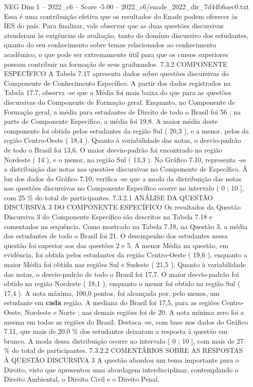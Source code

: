 \begin{textsample}{NEG Dim 1 – 2022\_c6 – Score -5.00 – 2022\_c6/enade\_2022\_dir\_7d44b6aec0.txt}
Essa é uma contribuição efetiva que os resultados do Enade podem oferecer às IES do país.
Para finalizar, vale observar que as duas questões discursivas atenderam às exigências de avaliação, tanto do domínio discursivo dos estudantes, quanto do seu conhecimento sobre temas relacionados ao conhecimento acadêmico, o que pode ser extremamente útil para que os cursos superiores possam contribuir na formação de seus graduandos. 7.3.2 COMPONENTE ESPECÍFICO A Tabela 7.17 apresenta dados sobre questões discursivas do Componente de Conhecimento Específico.
A partir dos dados registrados na Tabela 17.7, observa -se que a Média foi mais baixa do que para as questões discursivas do Componente de Formação geral.
Enquanto, no Componente de Formação geral, a média para estudantes de Direito de todo o Brasil foi 56 ; na parte de Componente Específico, a média foi 19,8.
A maior média deste componente foi obtida pelos estudantes da região Sul ( 20,3 ), e a menor, pelos da região Centro-Oeste ( 18,4 ).
Quanto à variabilidade das notas, o desvio-padrão de todo o Brasil foi 13,6.
O maior desvio-padrão foi encontrado na região Nordeste ( 14 ), e o menor, na região Sul ( 13,3 ).
No Gráfico 7.10, representa -se a distribuição das notas nas questões discursivas no Componente de Específico.
À luz dos dados do Gráfico 7.10, verifica -se que a moda da distribuição das notas nas questões discursivas no Componente Específico ocorre no intervalo ( 0 ; 10 ], com 25 \% do total de participantes. 7.3.2.1 ANÁLISE DA QUESTÃO DISCURSIVA 3 DO COMPONENTE ESPECÍFICO Os resultados da Questão Discursiva 3 do Componente Específico são descritos na Tabela 7.18 e comentados na sequência.
Como mostrado na Tabela 7.18, na Questão 3, a média dos estudantes de todo o Brasil foi 21.
O desempenho dos estudantes nessa questão foi superior aos das questões 2 e 5.
A menor Média na questão, em evidência, foi obtida pelos estudantes da região Centro-Oeste ( 19,6 ), enquanto a maior Média foi obtida nas regiões Sul e Sudeste ( 21,5 ).
Quanto à variabilidade das notas, o desvio-padrão de todo o Brasil foi 17,7.
O maior desvio-padrão foi obtido na região Nordeste ( 18,1 ), enquanto o menor foi obtido na região Sul ( 17,4 ).
A nota máxima, 100,0 pontos, foi alcançada por, pelo menos, um estudante em \textbf{cada} região.
A mediana do Brasil foi 17,5, para as regiões Centro-Oeste, Nordeste e Norte ; nas demais regiões foi de 20.
A nota mínima zero foi a mesma em todas as regiões do Brasil.
Destaca -se, com base nos dados do Gráfico 7.11, que mais de 20,0 \% dos estudantes deixaram a resposta à questão em branco.
A moda dessa distribuição ocorre no intervalo ( 0 ; 10 ], com mais de 27 \% do total de participantes. 7.3.2.2 COMENTÁRIOS SOBRE AS RESPOSTAS À QUESTÃO DISCURSIVA 3 A questão abordou um tema importante para o Direito, visto que apresentou uma abordagem interdisciplinar, contemplando o Direito Ambiental, o Direito Civil e o Direito Penal.

\end{textsample}
